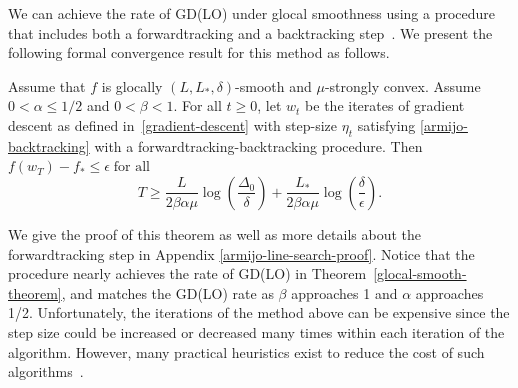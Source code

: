 \documentclass[10pt]{article} %
\begin{document}
We can achieve the rate of GD(LO) under glocal smoothness using a procedure that includes both a forwardtracking and a backtracking step~\cite{fridovich2019choosing}. We present the following formal convergence result for this method as follows.

\begin{theorem}
    \label{glocal-smooth-armijo-theorem}
    Assume that $f$ is glocally $(L, L_*, \delta)$-smooth and $\mu$-strongly convex. Assume $0 < \alpha \leq 1/2$ and $0 < \beta < 1$. For all $t \geq 0$, let $w_t$ be the iterates of gradient descent as defined in~\eqref{gradient-descent} with step-size $\eta_t$ satisfying \eqref{armijo-backtracking} with a forwardtracking-backtracking procedure. Then $f(w_T) - f_* \leq \epsilon \;\text{for all}$
    \begin{equation*}
        T \geq
        \frac{L}{2\beta\alpha\mu}\log\left(\frac{\Delta_{0}}{\delta}\right) + \frac{L_*}{2\beta\alpha\mu}\log\left(\frac{\delta}{\epsilon}\right).
    \end{equation*}
\end{theorem}

We give the proof of this theorem as well as more details about the forwardtracking step in Appendix \ref{armijo-line-search-proof}. Notice that the procedure nearly achieves the rate of GD(LO) in Theorem~\ref{glocal-smooth-theorem}, and matches the GD(LO) rate as $\beta$ approaches 1 and $\alpha$ approaches 1/2. Unfortunately, the iterations of the method above can be expensive since the step size could be increased or decreased many times within each iteration of the algorithm. However, many practical heuristics exist to reduce the cost of such algorithms~\cite{More1994,nocedal1999numerical}. 
\end{document}
